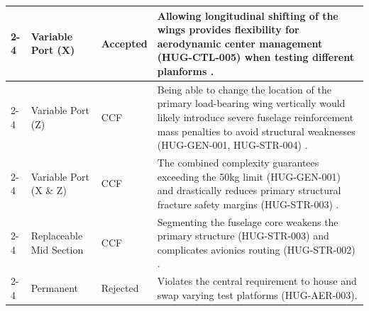 \begin{longtable}{|p{1.6cm}|p{2.3cm}|p{1.6cm}|p{9.5cm}|}
\cline{2-4}
\multicolumn{1}{|l|}{} & Variable Port (X) & Accepted & Allowing longitudinal shifting of the wings provides flexibility for aerodynamic center management (HUG-CTL-005) when testing different planforms \cite{Vos}. \\
\cline{2-4}
\multicolumn{1}{|l|}{} & Variable Port (Z) & CCF & Being able to change the location of the primary load-bearing wing vertically would likely introduce severe fuselage reinforcement mass penalties to avoid structural weaknesses (HUG-GEN-001, HUG-STR-004) \cite{raymer1992aircraft}. \\
\cline{2-4}
\multicolumn{1}{|l|}{} & Variable Port (X \& Z) & CCF & The combined complexity guarantees exceeding the 50kg limit (HUG-GEN-001) and drastically reduces primary structural fracture safety margins (HUG-STR-003) \cite{raymer1992aircraft}. \\
\cline{2-4}
\multicolumn{1}{|l|}{} & Replaceable Mid Section & CCF & Segmenting the fuselage core weakens the primary structure (HUG-STR-003) and complicates avionics routing (HUG-STR-002) \cite{Airbus_Concurent}. \\
\cline{2-4}
\multicolumn{1}{|l|}{} & Permanent & Rejected & Violates the central requirement to house and swap varying test platforms (HUG-AER-003). \\
\hline


\end{longtable}

